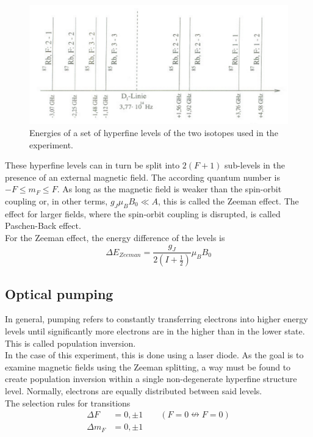 \begin{figure}[H]
\centering
\includegraphics[width=1.0\linewidth]{graphics/hfslevels}
\caption[Hyperfine structure energies]{Energies of a set of hyperfine levels of the two isotopes used in the experiment. \cite{staatsex}}
\label{fig:hfslevels}
\end{figure}

These hyperfine levels can in turn be split into $2(F+1)$ sub-levels in the presence of an external magnetic field. The according quantum number is $-F\le m_F\le F$. As long as the magnetic field is weaker than the spin-orbit coupling or, in other terms, $g_J\mu_BB_0\ll A$, this is called the Zeeman effect. The effect for larger fields, where the spin-orbit coupling is disrupted, is called Paschen-Back effect.\\
For the Zeeman effect, the energy difference of the levels is
\begin{equation}
\Delta E_{Zeeman}=\frac{g_J}{2(I+\frac{1}{2})}\mu_BB_0
\label{eq:zeemanlevels}
\end{equation}

\subsection{Optical pumping}
In general, pumping refers to constantly transferring electrons into higher energy levels until significantly more electrons are in the higher than in the lower state. This is called population inversion.\\
In the case of this experiment, this is done using a laser diode. As the goal is to examine magnetic fields using the Zeeman splitting, a way must be found to create population inversion within a single non-degenerate hyperfine structure level. Normally, electrons are equally distributed between said levels.\\
The selection rules for transitions
\begin{equation}
\begin{aligned}
\Delta F&=0,\pm 1 \qquad (F=0\nleftrightarrow F=0)\\
\Delta m_F&=0,\pm 1
\end{aligned}
\end{equation}

